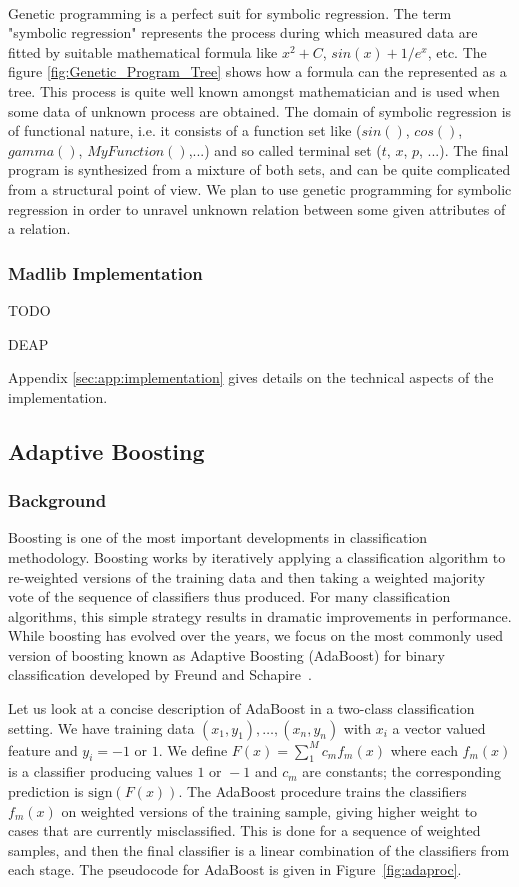 ~~\\
Genetic programming is a perfect suit for symbolic regression. The term "symbolic regression" represents the process during which measured data are fitted by suitable mathematical formula like $x^2 + C$, $sin(x) + 1/e^x$,  etc. The figure \ref{fig:Genetic_Program_Tree} shows how a formula can the represented as a tree. This process is quite well known amongst mathematician and is used when some data of unknown process are obtained. The domain of symbolic regression is of functional nature, i.e. it consists of a function set like ($sin()$, $cos()$, $gamma()$, $MyFunction()$,...) and so called terminal set ($t$, $x$, $p$, ...). The final program is synthesized from a mixture of both sets, and can be quite complicated from a structural point of view. We plan to use genetic programming for symbolic regression in order to unravel unknown relation between some given attributes of a relation. 


\subsubsection{Madlib Implementation}
TODO

DEAP

Appendix \ref{sec:app:implementation} gives details on the technical aspects of the implementation.

\subsection{Adaptive Boosting}
\subsubsection{Background}
Boosting is one of the most important developments in classification methodology. Boosting works by iteratively applying a classification algorithm to re-weighted versions of the training data and then taking a weighted majority vote of the sequence of classifiers thus produced. For many classification algorithms, this simple strategy results in dramatic improvements in performance. While boosting has evolved over the years, we focus on the most commonly used version of boosting known as Adaptive Boosting (AdaBoost) for binary classification developed by Freund and Schapire~\cite{boost96}.

Let us look at a concise description of AdaBoost in a two-class classification setting. We have training data $(x_1, y_1), \ldots, (x_n, y_n)$ with $x_i$ a vector valued feature and $y_i = -1\text{ or }1$. We define $F(x) = \sum_1^M{c_mf_m(x)}$ where each $f_m(x)$ is a classifier producing values $1\text{ or }-1$ and $c_m$ are constants; the corresponding prediction is $\text{sign}(F(x))$. The AdaBoost procedure trains the classifiers $f_m(x)$ on weighted versions of the training sample, giving higher weight to cases that are currently misclassified. This is done for a sequence of weighted samples, and then the final classifier is a linear combination of the classifiers from each stage. The pseudocode for AdaBoost is given in Figure~\ref{fig:adaproc}.

